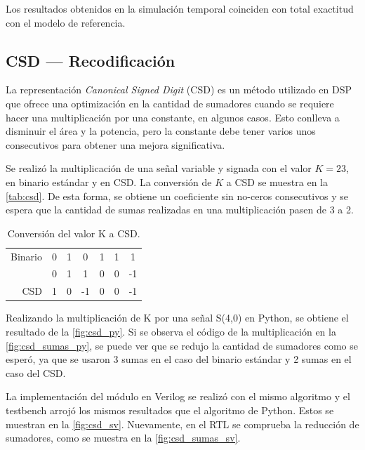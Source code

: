 \documentclass[12pt,a4paper]{article}
\begin{document}
Los resultados obtenidos en la simulación temporal coinciden con total exactitud con el modelo de referencia.



\subsection{CSD — Recodificación}                                   \label{sec_2.4}

La representación \emph{Canonical Signed Digit} (CSD) es un método utilizado en DSP que ofrece una optimización en la cantidad de sumadores cuando se requiere hacer una multiplicación por una constante, en algunos casos. Esto conlleva a disminuir el área y la potencia, pero la constante debe tener varios unos consecutivos para obtener una mejora significativa.

Se realizó la multiplicación de una señal variable y signada con el valor $K = 23$, en binario estándar y en CSD. La conversión de $K$ a CSD se muestra en la \autoref{tab:csd}. De esta forma, se obtiene un coeficiente sin no-ceros consecutivos y se espera que la cantidad de sumas realizadas en una multiplicación pasen de 3 a 2.

\begin{table}[H]
    \centering
    \begin{tabular}{r|cccccc}
         Binario & 0 & 1 & 0 & \color{red}1 & \color{red}1 & \color{red}1 \\
          & 0 & \color{red}1 & \color{red}1 & 0 & 0 & -1 \\
         CSD & 1 & 0 & -1 & 0 & 0 & -1 \\
    \end{tabular}
    \caption{Conversión del valor K a CSD.}
    \label{tab:csd}
\end{table}

Realizando la multiplicación de K por una señal S(4,0) en Python, se obtiene el resultado de la \autoref{fig:csd_py}. Si se observa el código de la multiplicación en la \autoref{fig:csd_sumas_py}, se puede ver que se redujo la cantidad de sumadores como se esperó, ya que se usaron 3 sumas en el caso del binario estándar y 2 sumas en el caso del CSD.

La implementación del módulo en Verilog se realizó con el mismo algoritmo y el testbench arrojó los mismos resultados que el algoritmo de Python. Estos se muestran en la \autoref{fig:csd_sv}. Nuevamente, en el RTL se comprueba la reducción de sumadores, como se muestra en la \autoref{fig:csd_sumas_sv}.
\end{document}

